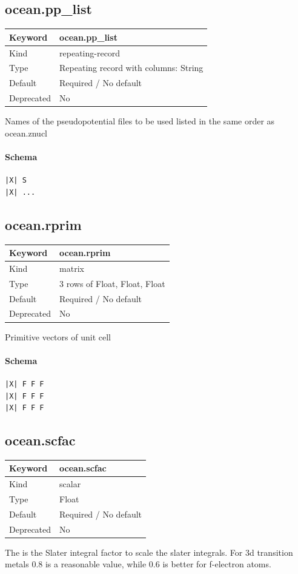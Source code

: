 \documentclass[11pt]{article}
\begin{document}
{{{{{\subsection{ocean.pp\_list}
\label{kw:ocean-pp-list}
\begin{longtable}{|p{1.5in}|p{4.5in}|}
\hline
Keyword & ocean.pp\_list \\
\hline
Kind & repeating-record \\
\hline
Type & Repeating record with columns: String \\
\hline
Default & Required / No default \\
\hline
Deprecated & No \\
\hline
\end{longtable}
 Names of the pseudopotential files to be used listed in the same order as
 ocean.znucl

\paragraph{Schema}
\begin{Verbatim}
|X| S
|X| ...
\end{Verbatim}

\subsection{ocean.rprim}
\label{kw:ocean-rprim}
\begin{longtable}{|p{1.5in}|p{4.5in}|}
\hline
Keyword & ocean.rprim \\
\hline
Kind & matrix \\
\hline
Type & 3 rows of Float, Float, Float \\
\hline
Default & Required / No default \\
\hline
Deprecated & No \\
\hline
\end{longtable}
 Primitive vectors of unit cell

\paragraph{Schema}
\begin{Verbatim}
|X| F F F
|X| F F F
|X| F F F
\end{Verbatim}

\subsection{ocean.scfac}
\label{kw:ocean-scfac}
\begin{longtable}{|p{1.5in}|p{4.5in}|}
\hline
Keyword & ocean.scfac \\
\hline
Kind & scalar \\
\hline
Type & Float \\
\hline
Default & Required / No default \\
\hline
Deprecated & No \\
\hline
\end{longtable}
 The is the Slater integral factor to scale the slater integrals. For 3d
 transition metals 0.8 is a reasonable value, while 0.6 is better for
 f-electron atoms.

}}}}}
\end{document}
